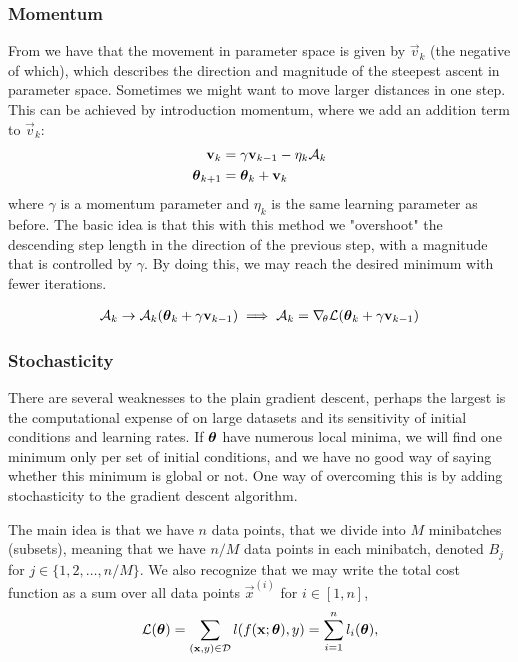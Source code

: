     \subsubsection{Momentum}\label{sec:momentum}
        From  we have that the movement in parameter space is given by $\vec{v}_k$ (the negative of which), which describes the direction and magnitude of the steepest ascent in parameter space. Sometimes we might want to move larger distances in one step. This can be achieved by introduction momentum, where we add an addition term to $\vec{v}_k$:
        \begin{align}
            \mathbf{v}_k &= \gamma\mathbf{v}_{k-1} - \eta_k\mathcal{A}_k \nonumber \\
            \boldsymbol{\theta}_{k+1} &= \boldsymbol{\theta}_k + \mathbf{v}_k
        \end{align}
        where $\gamma$ is a momentum parameter and $\eta_k$ is the same learning parameter as before. The basic idea is that this with this method we "overshoot" the descending step length in the direction of the previous step, with a magnitude that is controlled by $\gamma$. By doing this, we may reach the desired minimum with fewer iterations. 

        \begin{align}\label{eq:nag}
            \mathcal{A}_k \to \mathcal{A}_k(\boldsymbol{\theta}_k + \gamma\mathbf{v}_{k-1}) \implies \mathcal{A}_k= \nabla_{\!\theta}\mathcal{L}(\boldsymbol{\theta}_k + \gamma\mathbf{v}_{k-1})
        \end{align}

    \subsubsection{Stochasticity}\label{sec:stochasticity}
        There are several weaknesses to the plain gradient descent, perhaps the largest is the computational expense of on large datasets and its sensitivity of initial conditions and learning rates. If $\boldsymbol{\theta}$ have numerous local minima, we will find one minimum only per set of initial conditions, and we have no good way of saying whether this minimum is global or not. One way of overcoming this is by adding stochasticity to the gradient descent algorithm. 

        The main idea is that we have $n$ data points, that we divide into $M$ minibatches (subsets), meaning that we have $n/M$ data points in each minibatch, denoted $B_j$ for $j\in\{1,2,\dots,n/M\}$. We also recognize that we may write the total cost function as a sum over all data points $\vec{x}^{(i)}$ for $i\in[1,n]$, 
        \begin{equation}
            \mathcal{L}(\boldsymbol{\theta}) =\sum_{(\mathbf{x}, y)\in \mathcal{D}} l(f(\mathbf{x};\boldsymbol{\theta}), y) = \sum_{i=1}^n l_i(\boldsymbol{\theta}),
        \end{equation}

